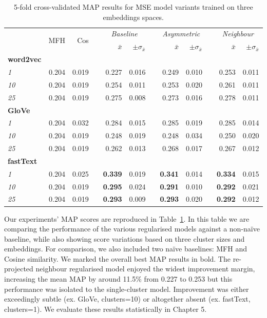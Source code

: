 \begin{table}\centering
\begin{tabular}{@{}lrrcrrcrrcrr@{}}\toprule
& \multirow{2}{*}{MFH} & \multirow{2}{*}{Cos} & \phantom{a} &  \multicolumn{2}{c}{\textit{Baseline}} & \phantom{a} & \multicolumn{2}{c}{\textit{Asymmetric}} & \phantom{a} & \multicolumn{2}{c}{\textit{Neighbour}}\\
\cmidrule{5-6} \cmidrule{8-9} \cmidrule{11-12}
&  &  && $\bar{x}$ & $\pm\sigma_{\bar{x}}$ && $\bar{x}$ & $\pm\sigma_{\bar{x}}$ && $\bar{x}$ & $\pm\sigma_{\bar{x}}$ \\ \midrule
\textbf{word2vec}\\
\textit{1} & 0.204 & 0.019 && 0.227 & 0.016 && 0.249 & 0.010 && 0.253 & 0.011 \\
\textit{10} & 0.204 & 0.019 && 0.254 & 0.011 && 0.253 & 0.020 && 0.261 & 0.011 \\
\textit{25} & 0.204 & 0.019 && 0.275 & 0.008 && 0.273 & 0.016 && 0.278 & 0.011 \\
\cmidrule{2-12}
\textbf{GloVe}\\
\textit{1} & 0.204 & 0.032 && 0.284 & 0.015 && 0.285 & 0.019 && 0.285 & 0.014 \\
\textit{10} & 0.204 & 0.019 && 0.248 & 0.019 && 0.248 & 0.034 && 0.250 & 0.020 \\
\textit{25} & 0.204 & 0.019 && 0.262 & 0.013 && 0.268 & 0.017 && 0.267 & 0.012 \\
\cmidrule{2-12}
\textbf{fastText}\\
\textit{1} & 0.204 & 0.025 && \textbf{0.339} & 0.019 && \textbf{0.341} & 0.014 && \textbf{0.334} & 0.015 \\
\textit{10} & 0.204 & 0.019 && \textbf{0.295} & 0.024 && \textbf{0.291} & 0.010 && \textbf{0.292} & 0.021 \\
\textit{25} & 0.204 & 0.019 && \textbf{0.293} & 0.009 && \textbf{0.293} & 0.020 && \textbf{0.292} & 0.012 \\
\bottomrule
\end{tabular}
\caption{5-fold cross-validated \ac{MAP} results for \ac{MSE} model variants trained on three embeddings spaces.}\label{tab:map_mse}
\end{table}
Our experiments' \ac{MAP} scores are reproduced in Table~\ref{tab:map_mse}.  In this table we are comparing the performance of the various regularised models against a non-na\"ive baseline, while also showing score variations based on three cluster sizes and embeddings.  For comparison, we also included two na\"ive baselines: MFH and Cosine similarity.  We marked the overall best \ac{MAP} results in bold.  The re-projected neighbour regularised model enjoyed the widest improvement margin, increasing the mean \ac{MAP} by around 11.5\% from 0.227 to 0.253 but this performance was isolated to the single-cluster model.  Improvement was either exceedingly subtle (ex. GloVe, clusters=10) or altogether absent (ex. fastText, clusters=1).  We evaluate these results statistically in Chapter 5.

